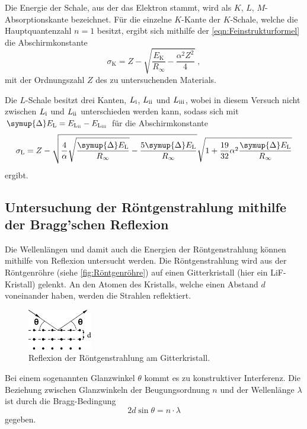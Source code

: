     Die Energie der Schale,
    aus der das Elektron stammt,
    wird als $K$, $L$, $M$-Absorptionskante bezeichnet.
    Für die einzelne $K$-Kante der $K$-Schale,
    welche die Hauptquantenzahl $n=1$ besitzt,
    ergibt sich mithilfe der \autoref{eqn:Feinstrukturformel} die Abschirmkonstante
    \begin{equation}
        \label{eqn:SigmaK}
        \sigma_\text{K} = Z - \sqrt{\frac{E_\text{K}}{R_\infty} - \frac{\alpha^2 Z^2}{4}} \; ,
    \end{equation}
    mit der Ordnungszahl $Z$ des zu untersuchenden Materials.

    \newcommand{\romansub}[1]{\mathrm{\uppercase\expandafter{\romannumeral #1}}}

    Die $L$-Schale besitzt drei Kanten,
    $L_{\romansub{1}}$, $L_{\romansub{2}}$ und $L_{\romansub{3}}$,
    wobei in diesem Versuch nicht zwischen $L_{\romansub{1}}$ und $L_{\romansub{2}}$ unterschieden werden kann,
    sodass sich mit $\symup{\Delta} E_\text{L} = E_{\text{L}_{\romansub{2}}} - E_{\text{L}_{\romansub{3}}}$
    für die Abschirmkonstante
    \begin{equation}
        \sigma_\text{L} = Z - \sqrt{\frac{4}{\alpha}
        \sqrt{\frac{\symup{\Delta}E_\text{L}}{R_\infty}} - \frac{5\symup{\Delta}E_\text{L}}{R_\infty}}
        \sqrt{1 + \frac{19}{32}\alpha^2 \frac{\symup{\Delta}E_\text{L}}{R_\infty}}
    \end{equation}
    ergibt.


\subsection{Untersuchung der Röntgenstrahlung mithilfe der Bragg'schen Reflexion}

    Die Wellenlängen und damit auch die Energien der Röntgenstrahlung können mithilfe von Reflexion untersucht werden.
    Die Röntgenstrahlung wird aus der Röntgenröhre (siehe \autoref{fig:Röntgenröhre}) auf einen Gitterkristall (hier ein LiF-Kristall) gelenkt.
    An den Atomen des Kristalls,
    welche einen Abstand $d$ voneinander haben,
    werden die Strahlen reflektiert.
    \begin{figure}
        \centering
        \includegraphics[width=0.25\textwidth]{content/img/Abb_3.pdf}
        \caption{Reflexion der Röntgenstrahlung am Gitterkristall. \cite{versuchsanleitung}}
        \label{fig:BraggReflexion}
    \end{figure}

    Bei einem sogenannten Glanzwinkel $\theta$ kommt es zu konstruktiver Interferenz.
    Die Beziehung zwischen Glanzwinkeln der Beugungsordnung $n$ und der Wellenlänge $\lambda$
    ist durch die Bragg-Bedingung
    \begin{equation}
        \label{eqn:BraggBedingung}
        2 d \sin{\theta} = n \cdot \lambda
    \end{equation}
    gegeben.
